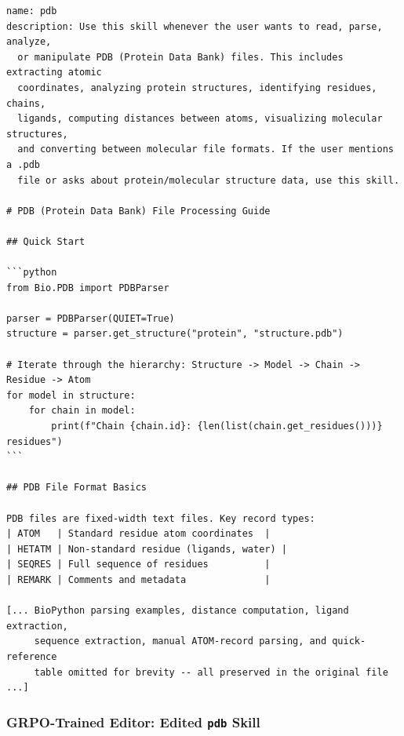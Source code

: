 \begin{small}
\begin{verbatim}
name: pdb
description: Use this skill whenever the user wants to read, parse, analyze,
  or manipulate PDB (Protein Data Bank) files. This includes extracting atomic
  coordinates, analyzing protein structures, identifying residues, chains,
  ligands, computing distances between atoms, visualizing molecular structures,
  and converting between molecular file formats. If the user mentions a .pdb
  file or asks about protein/molecular structure data, use this skill.

# PDB (Protein Data Bank) File Processing Guide

## Quick Start

```python
from Bio.PDB import PDBParser

parser = PDBParser(QUIET=True)
structure = parser.get_structure("protein", "structure.pdb")

# Iterate through the hierarchy: Structure -> Model -> Chain -> Residue -> Atom
for model in structure:
    for chain in model:
        print(f"Chain {chain.id}: {len(list(chain.get_residues()))} residues")
```

## PDB File Format Basics

PDB files are fixed-width text files. Key record types:
| ATOM   | Standard residue atom coordinates  |
| HETATM | Non-standard residue (ligands, water) |
| SEQRES | Full sequence of residues          |
| REMARK | Comments and metadata              |

[... BioPython parsing examples, distance computation, ligand extraction,
     sequence extraction, manual ATOM-record parsing, and quick-reference
     table omitted for brevity -- all preserved in the original file ...]
\end{verbatim}
\end{small}

\subsubsection{GRPO-Trained Editor: Edited \texttt{pdb} Skill}

